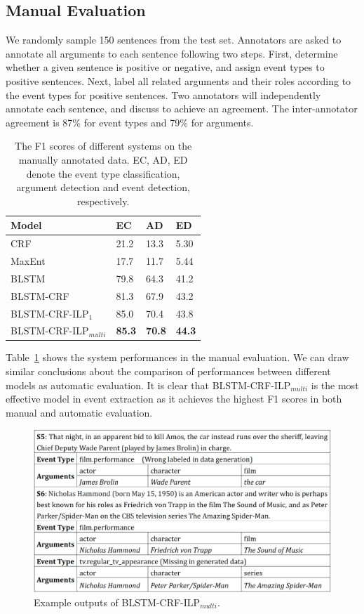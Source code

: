 \subsection{Manual Evaluation \label{manualeve}}
We randomly sample 150 sentences from the test set. Annotators are asked to annotate all arguments to each sentence following two steps. First, determine whether a given sentence is positive or negative, and assign event types to positive sentences. Next, label all related arguments and their roles according to the event types for positive sentences. Two annotators will independently annotate each sentence, and discuss to achieve an agreement. The inter-annotator agreement is 87\% for event types and 79\% for arguments.

\begin{table}[h]
\small
\centering
\begin{tabular}{|l|p{0.8cm}<{\centering}|p{0.8cm}<{\centering}|p{0.8cm}<{\centering}|} \hline
	Model & EC & AD & ED \\ \hline
	CRF & 21.2 & 13.3 & 5.30 \\ \hline
	MaxEnt & 17.7 & 11.7 & 5.44 \\ \hline
	BLSTM & 79.8 & 64.3 & 41.2 \\ \hline \hline
	BLSTM-CRF & 81.3 & 67.9 & 43.2 \\ \hline
	BLSTM-CRF-ILP$_{1}$ & 85.0 & 70.4 & 43.8 \\ \hline
	BLSTM-CRF-ILP$_{multi}$ & \textbf{85.3} & \textbf{70.8} & \textbf{44.3} \\ \hline
\end{tabular}
\caption{ The F1 scores of different systems on the manually annotated data. EC, AD, ED denote the event type classification, argument detection and event detection, respectively. \label{tab:2}}
\end{table}

Table~\ref{tab:2} shows the system performances in the manual evaluation. We can draw similar conclusions about the comparison of performances between different models as automatic evaluation. It is clear that BLSTM-CRF-ILP$_{multi}$ is the most effective model in event extraction as it achieves the highest F1 scores in both manual and automatic evaluation.

\begin{figure}[h]
	\centering
	\includegraphics[width=.48\textwidth]{figure3.png}
	\caption{Example outputs of BLSTM-CRF-ILP$_{multi}$.\label{fig:1}}
\end{figure}


